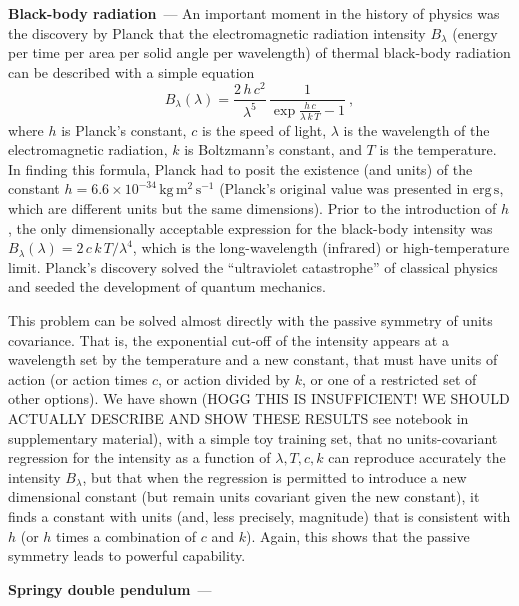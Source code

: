 \documentclass[11pt]{article}
\newcommand{\unit}[1]{\mathrm{#1}}
\newcommand{\kg}{\unit{kg}}
\newcommand{\m}{\unit{m}}
\newcommand{\s}{\unit{s}}
\renewcommand{\paragraph}[1]{\medskip\par\noindent\textbf{#1}~---}
\begin{document}
\paragraph{Black-body radiation}
An important moment in the history of physics was the discovery by Planck that the electromagnetic radiation intensity $B_\lambda$ (energy per time per area per solid angle per wavelength) of thermal black-body radiation can be described with a simple equation \cite{planck}
\begin{equation}
    B_\lambda(\lambda) = \frac{2\,h\,c^2}{\lambda^5}\,\frac{1}{\exp\frac{h\,c}{\lambda\,k\,T} - 1}~,
\end{equation}
where $h$ is Planck's constant,
$c$ is the speed of light,
$\lambda$ is the wavelength of the electromagnetic radiation,
$k$ is Boltzmann's constant,
and $T$ is the temperature.
In finding this formula, Planck had to posit the existence (and units) of the constant $h=6.6\times 10^{-34}\,\kg\,\m^2\,\s^{-1}$ (Planck's original value was presented in $\mathrm{erg}\,\s$, which are different units but the same dimensions).
Prior to the introduction of $h$, the only dimensionally acceptable expression for the black-body intensity was $B_\lambda(\lambda)=2\,c\,k\,T/\lambda^4$, which is the long-wavelength (infrared) or high-temperature limit.
Planck's discovery solved the ``ultraviolet catastrophe'' of classical physics and seeded the development of quantum mechanics.

This problem can be solved almost directly with the passive symmetry of units covariance.
That is, the exponential cut-off of the intensity appears at a wavelength set by the temperature and a new constant, that must have units of action (or action times $c$, or action divided by $k$, or one of a restricted set of other options).
We have shown (HOGG THIS IS INSUFFICIENT! WE SHOULD ACTUALLY DESCRIBE AND SHOW THESE RESULTS see notebook in supplementary material), with a simple toy training set, that no units-covariant regression for the intensity as a function of $\lambda, T, c, k$ can reproduce accurately the intensity $B_\lambda$, but that when the regression is permitted to introduce a new dimensional constant (but remain units covariant given the new constant), it finds a constant with units (and, less precisely, magnitude) that is consistent with $h$ (or $h$ times a combination of $c$ and $k$).
Again, this shows that the passive symmetry leads to powerful capability.

\paragraph{Springy double pendulum}
\end{document}

